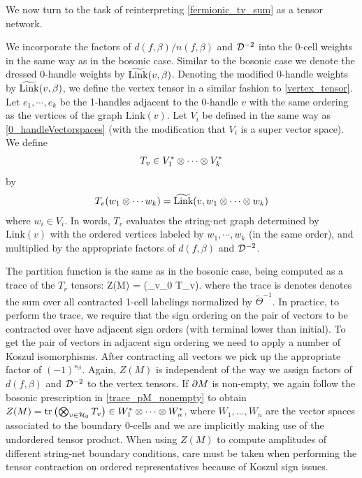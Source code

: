We now turn to the task of reinterpreting \eqref{fermionic_tv_sum} as a tensor network. %

\medskip

We incorporate the factors of $d(f, \beta)/n(f,\beta)$ and $\mathcal{D}^{-2}$ into the 0-cell 
weights 
in the same way as in the bosonic case. 
Similar to the bosonic case we denote the dressed 0-handle weights by $\widetilde{\rm Link}(v,\beta)$.
Denoting the modified 0-handle weights by $\widetilde{\rm Link}(v,\beta)$, 
we define the vertex tensor in a similar fashion to \eqref{vertex_tensor}. 
Let $e_1, \cdots, e_k$ be the 1-handles adjacent to the 0-handle $v$ with the same ordering as the vertices of the graph $\text{Link}(v)$.
Let $V_i$ be defined in the same way as \eqref{0_handleVectorspaces} (with the modification that $V_i$ is a super vector space).
We define 
\begin{align} 
T_v  \in V_1^* \otimes \cdots \otimes V_k^*
\end{align}
by 
\begin{align}
T_v(w_1 \otimes \cdots w_k) = \widetilde{\text{Link}}(v, w_1 \otimes \cdots \otimes w_k)
\end{align} 
where $w_i \in V_i$.
In words, $T_v$ evaluates the string-net graph determined by $\text{Link}(v)$ with the ordered vertices labeled by $w_1, \cdots, w_k$ (in the same order), and multiplied by the appropriate factors of $d(f,\beta)$ and $\mathcal{D}^{-2}$.

The partition function 
is the same as in the bosonic case, being computed as a trace of the $T_v$ tensors:
\be \label{fermion_Z_as_tr} Z(M) = \tr \left(\bigotimes_{v\in \mch_0} T_v\right).\ee
where the trace is denotes denotes the sum over all contracted 1-cell labelings normalized by $\widetilde{\Theta}^{-1}$.
In practice, to perform the trace, we require that the sign ordering on the pair of vectors to be contracted over have adjacent sign orders (with terminal lower than initial). 
To get the pair of vectors in adjacent sign ordering we need to apply a number of Koszul isomorphisms. 
After contracting all vectors we pick up the appropriate factor of $(-1)^{\kappa_\beta}$. 
Again, $Z(M)$
is independent of the way we assign factors of $d(f,\beta)$ and $\mathcal{D}^{-2}$ to the 
vertex tensors. 
If $\partial M$ is non-empty, we again follow the bosonic prescription in \eqref{trace_pM_nonempty} 
to obtain $Z(M) = \text{tr} \left( \bigotimes_{v\in \mathcal{H}_0} T_v \right) \in W_1^*\otimes\cdots\otimes W_n^*$, where 
$W_1, \ldots, W_n$ are the vector spaces associated to the boundary 0-cells and we 
are implicitly making use of the undordered tensor product. When using $Z(M)$ to compute 
amplitudes of different string-net boundary conditions, care must be taken when performing the 
tensor contraction on ordered representatives because of Koszul sign issues. 

